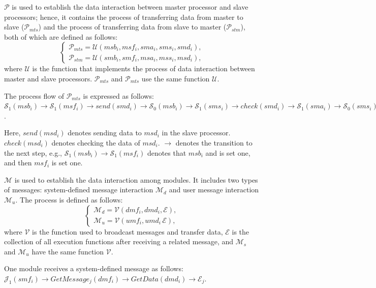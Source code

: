 \documentclass[journal,UTF8]{IEEEtran}
\begin{document}
$\mathcal{P}$ is used to establish the data interaction between master processor and slave processors; hence, it contains the process of transferring data from master to slave ($\mathcal{P}_{mts}$) and the process of transferring data from slave to master ($\mathcal{P}_{stm}$), both of which are defined as follows:
 \begin{equation}
 \left\{
 \begin{array}{l}
 \mathcal{P}_{mts} = \mathcal{U} (msb_i,msf_i,sma_i,sms_i,smd_i),\\
 \mathcal{P}_{stm} = \mathcal{U} (smb_i,smf_i,msa_i,mss_i,msd_i),
 \end{array}
 \right.
 \end{equation}
where $\mathcal{U}$ is the function that implements the process of data interaction between master and slave processors. $\mathcal{P}_{mts}$ and $\mathcal{P}_{mts}$ use the same function $\mathcal{U}$.

The process flow of $\mathcal{P}_{mts}$ is expressed  as follows:
 $\mathcal{S}_1(msb_i)\to\mathcal{S}_1(msf_i)\to send(smd_i)\to\mathcal{S}_0(msb_i)\to\mathcal{S}_1(sms_i)\to check(smd_i)\to\mathcal{S}_1(sma_i)\to\mathcal{S}_0(sms_i)\to\mathcal{S}_0(sma_i)\to\mathcal{S}_0(msf_i)$.
 
Here, $send(msd_i)$ denotes sending data to $msd_i$ in the slave processor. $check(msd_i)$ denotes checking the  data of $msd_i$. $\to$ denotes the transition to the next step, e.g., $\mathcal{S}_1(msb_i)\to\mathcal{S}_1(msf_i)$ denotes that $msb_i$ and is set one, and then $msf_i$ is set one.
 
$\mathcal{M}$ is used to establish the data interaction among modules. It includes two types of messages: system-defined message interaction $\mathcal{M}_{d}$ and user message interaction $\mathcal{M}_{u}$. The process is defined as follows:
 \begin{equation}
\left\{
\begin{array}{l}
\mathcal{M}_{d} = \mathcal{V} (dmf_i,dmd_i,\mathcal{E}),\\
\mathcal{M}_{u} = \mathcal{V} (umf_i,umd_i\,\mathcal{E}),
\end{array}
\right.
\end{equation}
where $\mathcal{V}$ is the function used to broadcast messages and transfer data, $\mathcal{E}$ is the collection of all execution functions after receiving a related message, and $\mathcal{M}_{s}$ and $\mathcal{M}_{u}$ have the same function $\mathcal{V}$.

One module receives a system-defined message as follows:
$\mathcal{J}_1(smf_i)\to GetMessage_{j}(dmf_i)\to GetData(dmd_i)\to\mathcal{E}_j$.
\end{document}
